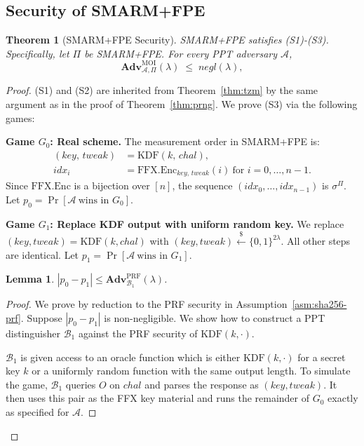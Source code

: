 \documentclass{ieeeaccess}
\newcommand{\rtsmarmtwo}{SMARM+FPE\xspace}
\newtheorem{lemma}{Lemma}[section]
\newtheorem{theorem}{Theorem}[section]
\newcommand{\Adv}{\mathbf{Adv}}
\begin{document}
\subsection{Security of \rtsmarmtwo}
\label{sec:proof-fpe}
 
\begin{theorem}[\rtsmarmtwo Security]
\label{thm:fpe}
\rtsmarmtwo satisfies (S1)-(S3).
Specifically, let $\Pi$ be \rtsmarmtwo.
For every PPT adversary $\mathcal{A}$,
\[
  \Adv^{\mathrm{MOI}}_{\mathcal{A},\Pi}(\lambda) \;\leq\; \mathit{negl}(\lambda),
\]
\end{theorem}

\begin{proof}
(S1) and (S2) are inherited from Theorem~\ref{thm:tzm} by the same
argument as in the proof of Theorem~\ref{thm:prng}.
We prove (S3) via the following games:
 
\medskip
\noindent\textbf{Game $G_0$: Real scheme.}
The measurement order in \rtsmarmtwo is:
\begin{align*}
  (\mathit{key},\, \mathit{tweak})
      &= \mathrm{KDF}(k,\, \mathit{chal}), \\
  \mathit{idx}_i
      &= \mathrm{FFX.Enc}_{\mathit{key},\,\mathit{tweak}}(i)
         \ \text{for } i = 0,\dots,n-1.
\end{align*}
Since $\mathrm{FFX.Enc}$ is a bijection over $[n]$, the sequence
$(\mathit{idx}_0,\dots,\mathit{idx}_{n-1})$ is $\sigma^\Pi$.
Let $p_0 = \Pr[\mathcal{A}\ \text{wins in }G_0]$.
 
\medskip
\noindent\textbf{Game $G_1$: Replace KDF output with uniform random key.}
We replace $(\mathit{key},\mathit{tweak}) = \mathrm{KDF}(k,\mathit{chal})$
with $(\mathit{key},\mathit{tweak}) \xleftarrow{\$} \{0,1\}^{2\lambda}$.
All other steps are identical.
Let $p_1 = \Pr[\mathcal{A}\ \text{wins in }G_1]$.
 
\begin{lemma}
\label{lem:fpe-g0-g1}
$|p_0 - p_1| \leq \Adv^{\mathrm{PRF}}_{\mathcal{B}_1}(\lambda)$.
\end{lemma}
\begin{proof}
We prove by reduction to the PRF security in Assumption~\ref{asm:sha256-prf}.
Suppose $|p_0 - p_1|$ is non-negligible.
We show how to construct a PPT distinguisher $\mathcal{B}_1$ against the PRF security of
$\mathrm{KDF}(k,\cdot)$.

$\mathcal{B}_1$ is given access to an oracle function
which is either $\mathrm{KDF}(k,\cdot)$ for a secret key $k$ or a uniformly random
function with the same output length.
To simulate the game, $\mathcal{B}_1$ queries $O$ on
$\mathit{chal}$ and parses the response as
$(\mathit{key},\mathit{tweak})$.
It then uses this pair as the FFX key material and runs the remainder of
$G_0$ exactly as specified for $\mathcal{A}$.


\end{proof}
\end{proof}
\end{document}
